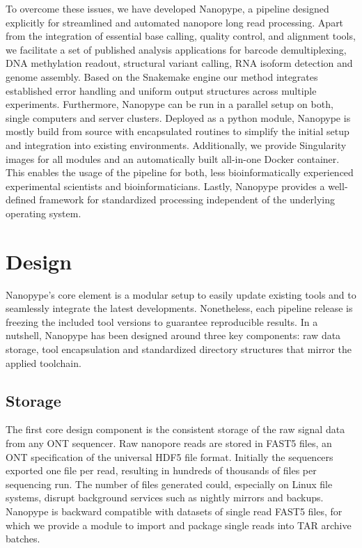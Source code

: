 To overcome these issues, we have developed Nanopype, a pipeline designed explicitly for streamlined and automated nanopore long read processing. Apart from the integration of essential base calling, quality control, and alignment tools, we facilitate a set of published analysis applications for barcode demultiplexing, DNA methylation readout, structural variant calling, RNA isoform detection and genome assembly. 
Based on the Snakemake engine \cite{Koester2012} our method integrates established error handling and uniform output structures across multiple experiments. Furthermore, Nanopype can be run in a parallel setup on both, single computers and server clusters. Deployed as a python module, Nanopype is mostly build from source with encapsulated routines to simplify the initial setup and integration into existing environments. Additionally, we provide Singularity images for all modules and an automatically built all-in-one Docker container. This enables the usage of the pipeline for both, less bioinformatically experienced experimental scientists and bioinformaticians. Lastly, Nanopype provides a well-defined framework for standardized processing independent of the underlying operating system.




\section{Design}
\label{sec:nanopype:design}
Nanopype’s core element is a modular setup to easily update existing tools and to seamlessly integrate the latest developments. Nonetheless, each pipeline release is freezing the included tool versions to guarantee reproducible results. In a nutshell, Nanopype has been designed around three key components: raw data storage, tool encapsulation and standardized directory structures that mirror the applied toolchain.

\subsection{Storage}
\label{subsec:nanopype:storage}
The first core design component is the consistent storage of the raw signal data from any ONT sequencer. 
Raw nanopore reads are stored in FAST5 files, an ONT specification of the universal HDF5 file format. Initially the sequencers exported one file per read, resulting in hundreds of thousands of files per sequencing run. 
The number of files generated could, especially on Linux file systems, disrupt background services such as nightly mirrors and backups.
Nanopype is backward compatible with datasets of single read FAST5 files, for which we provide a module to import and package single reads into TAR archive batches.

